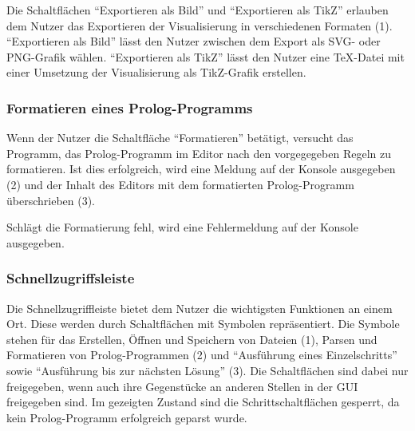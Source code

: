 \documentclass[parskip=full,11pt,twoside]{scrartcl}
\begin{document}
\begin{minipage}{\linewidth}
\end{minipage}

Die Schaltflächen \enquote{Exportieren als Bild} und \enquote{Exportieren als TikZ} erlauben dem Nutzer das Exportieren der Visualisierung in verschiedenen Formaten (1).
\enquote{Exportieren als Bild} lässt den Nutzer zwischen dem Export als SVG- oder PNG-Grafik wählen.
\enquote{Exportieren als TikZ} lässt den Nutzer eine TeX-Datei mit einer Umsetzung der Visualisierung als TikZ-Grafik erstellen.

\subsubsection{Formatieren eines Prolog-Programms}

\begin{minipage}{\linewidth}
\end{minipage}

Wenn der Nutzer die Schaltfläche \enquote{Formatieren} betätigt, versucht das Programm, das Prolog-Programm im Editor nach den vorgegegeben Regeln zu formatieren.
Ist dies erfolgreich, wird eine Meldung auf der Konsole ausgegeben (2) und der Inhalt des Editors mit dem formatierten Prolog-Programm überschrieben (3).

Schlägt die Formatierung fehl, wird eine Fehlermeldung auf der Konsole ausgegeben.

\subsubsection{Schnellzugriffsleiste}

\begin{minipage}{\linewidth}
\end{minipage}

Die Schnellzugriffleiste bietet dem Nutzer die wichtigsten Funktionen an einem Ort.
Diese werden durch Schaltflächen mit Symbolen repräsentiert.
Die Symbole stehen für das Erstellen, Öffnen und Speichern von Dateien (1), Parsen und Formatieren von Prolog-Programmen (2) und \enquote{Ausführung eines Einzelschritts} sowie \enquote{Ausführung bis zur nächsten Lösung} (3).
Die Schaltflächen sind dabei nur freigegeben, wenn auch ihre Gegenstücke an anderen Stellen in der GUI freigegeben sind.
Im gezeigten Zustand sind die Schrittschaltflächen gesperrt, da kein Prolog-Programm erfolgreich geparst wurde.
\end{document}
